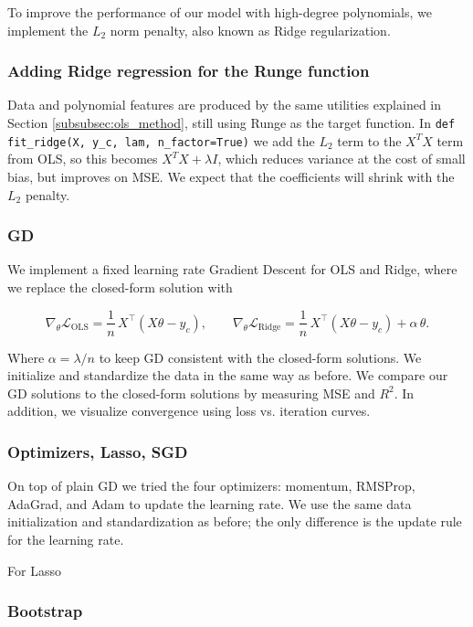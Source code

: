 \documentclass[amssymb,twocolumn,aps]{revtex4-2}
\begin{document}
To improve the performance of our model with high-degree polynomials, we implement the $L_2$ norm penalty, also known as Ridge regularization. \\

\subsubsection{Adding Ridge regression for the Runge function}
 \label{subsubsec:rdg_method}

Data and polynomial features are produced by the same utilities explained in Section \ref{subsubsec:ols_method}, still using Runge as the target function. In \texttt{def fit\_ridge(X, y\_c, lam, n\_factor=True)} we add the $L_2$ term to the $X^TX$ term from OLS, so this becomes $X^TX + \lambda I$, which reduces variance at the cost of small bias, but improves on MSE. We expect that the coefficients will shrink with the $L_2$ penalty. 

\subsubsection{GD}

We implement a fixed learning rate Gradient Descent for OLS and Ridge, where we replace the closed-form solution with 

\[
\nabla_{\theta}\mathcal{L}_{\text{OLS}} = \frac{1}{n}\,X^{\top}(X\theta - y_c),
\qquad
\nabla_{\theta}\mathcal{L}_{\text{Ridge}} = \frac{1}{n}\,X^{\top}(X\theta - y_c) + \alpha\,\theta.
\]

Where $\alpha = \lambda/n$ to keep GD consistent with the closed-form solutions. We initialize and standardize the data in the same way as before. We compare our GD solutions to the closed-form solutions by measuring MSE and $R^2$. In addition, we visualize convergence using loss vs. iteration curves. 

\subsubsection{Optimizers, Lasso, SGD}

On top of plain GD we tried the four optimizers: momentum, RMSProp, AdaGrad, and Adam to update the learning rate. We use the same data initialization and standardization as before; the only difference is the update rule for the learning rate. 

For Lasso 

\subsubsection{Bootstrap}
\end{document}
